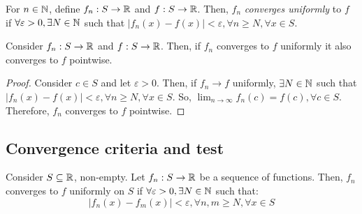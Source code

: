 \begin{definition}
    For $n \in \mathbb{N}$, define $f_n: S \to \mathbb{R}$ and $f: S \to \mathbb{R}$. Then, $f_n$ \emph{converges uniformly} to $f$ if $\forall \varepsilon > 0, \exists N \in \mathbb{N}$ such that $|f_n(x) - f(x)| < \varepsilon, \forall n \geq N, \forall x \in S$.
\end{definition}

\begin{theorem}
    Consider $f_n: S \to \mathbb{R}$ and $f: S \to \mathbb{R}$. Then, if $f_n$ converges to $f$ uniformly it also converges to $f$ pointwise.
\end{theorem}

\begin{proof}
    Consider $c \in S$ and let $\varepsilon > 0$. Then, if $f_n \to f$ uniformly, $\exists N \in \mathbb{N}$ such that $|f_n(x) - f(x)| < \varepsilon, \forall n \geq N, \forall x \in S$. So, $\lim_{n \to \infty} f_n(c) = f(c), \forall c \in S$. Therefore, $f_n$ converges to $f$ pointwise.
\end{proof}

\subsection{Convergence criteria and test}

\begin{theorem}
    Consider $S \subseteq \mathbb{R}$, non-empty. Let $f_n: S \to \mathbb{R}$ be a sequence of functions. Then, $f_n$ converges to $f$ uniformly on $S$ if $\forall \varepsilon > 0, \exists N \in \mathbb{N}$ such that:
    \begin{equation*}
        |f_n(x) - f_m(x)| < \varepsilon, \forall n, m \geq N, \forall x \in S
    \end{equation*}
\end{theorem}

